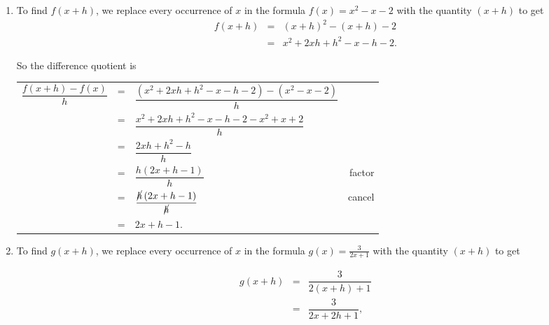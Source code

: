 {
\begin{enumerate}

\item To find $f(x+h)$, we replace every occurrence of $x$ in the formula $f(x) = x^2-x-2$ with the quantity $(x+h)$ to get \[ \begin{array}{rclr}  
 
 f(x+h) & = & (x+h)^2 - (x+h) -2 & \\ [8pt]
 & = & x^2 + 2xh + h^2 - x - h - 2.
 \end{array} \]

So the difference quotient is

\setlength{\extrarowheight}{12pt}

\begin{longtable}{rclr}  

$\dfrac{f(x+h)-f(x)}{h}$ & = & $\dfrac{\left(x^2+2xh+h^2-x-h-2 \right)-\left(x^{2}-x-2 \right)}{h}$ & \\[8pt] 
& = & $\dfrac{x^2+2xh+h^2-x-h-2-x^2+x+2}{h}$ & \\ [8pt]
& = & $\dfrac{2xh+h^2-h}{h}$ & \\ [8pt]
& = & $\dfrac{h \left(2x+h-1\right)}{h}$ & factor \\ [8pt]
& = & $\dfrac{\cancel{h} \left(2x+h-1\right)}{\cancel{h}}$ & cancel \\ [8pt]
& = & $2x+h-1$. \\

\end{longtable} 


\item To find $g(x+h)$, we replace every occurrence of $x$ in the formula $g(x) = \frac{3}{2x+1}$ with the quantity $(x+h)$ to get 

 \[ \begin{array}{rclr}  
 g(x+h) & = & \dfrac{3}{2(x+h)+1} & \\
 & = & \dfrac{3}{2x+2h+1}, 
 \end{array} \]


\end{enumerate}}

